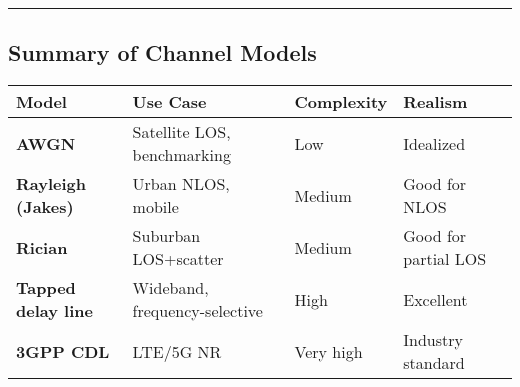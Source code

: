 \begin{Shaded}
\begin{Highlighting}[]
\OperatorTok{=}
\OperatorTok{=}

\OperatorTok{=}\OperatorTok{{-}}\OperatorTok{**}\NormalTok{)}
\NormalTok{(}\SpecialCharTok{\{}\OperatorTok{*}\NormalTok{)}
\end{Highlighting}
\end{Shaded}

\begin{center}\rule{0.5\linewidth}{0.5pt}\end{center}

\subsection{Summary of Channel Models}\label{summary-of-channel-models}

{\def\LTcaptype{} %
\begin{longtable}[]{@{}
  >{\raggedright\arraybackslash}p{}
  >{\raggedright\arraybackslash}p{}
  >{\raggedright\arraybackslash}p{}
  >{\raggedright\arraybackslash}p{}@{}}
\toprule\noalign{}
\begin{minipage}[b]{\linewidth}\raggedright
Model
\end{minipage} & \begin{minipage}[b]{\linewidth}\raggedright
Use Case
\end{minipage} & \begin{minipage}[b]{\linewidth}\raggedright
Complexity
\end{minipage} & \begin{minipage}[b]{\linewidth}\raggedright
Realism
\end{minipage} \\
\midrule\noalign{}
\endhead
\bottomrule\noalign{}
\endlastfoot
\textbf{AWGN} & Satellite LOS, benchmarking & Low & Idealized \\
\textbf{Rayleigh (Jakes)} & Urban NLOS, mobile & Medium & Good for
NLOS \\
\textbf{Rician} & Suburban LOS+scatter & Medium & Good for partial
LOS \\
\textbf{Tapped delay line} & Wideband, frequency-selective & High &
Excellent \\
\textbf{3GPP CDL} & LTE/5G NR & Very high & Industry standard \\
\end{longtable}
}

